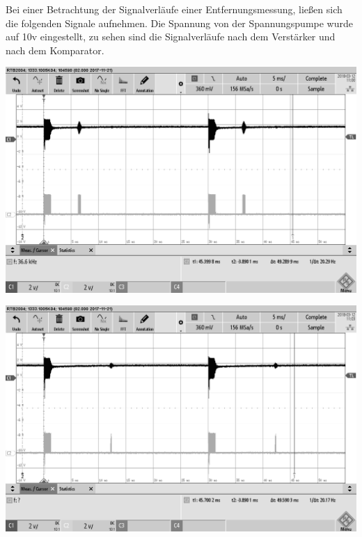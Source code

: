 Bei einer Betrachtung der Signalverläufe einer Entfernungsmessung, ließen sich die folgenden Signale aufnehmen. Die Spannung von der Spannungspumpe wurde auf 10v eingestellt, zu sehen sind die Signalverläufe nach dem Verstärker und nach dem Komparator.\\
\begin{minipage}{0.5\textwidth}
\includegraphics[width=1\textwidth%
]{Abbildungen/MessungenP2/10V/EKULIT1m.png}
\label{fig:EKULIT 1m}
\end{minipage}
\begin{minipage}{0.5\textwidth}
\includegraphics[width=1\textwidth%
]{Abbildungen/MessungenP2/10V/EKULIT2m.png}
\label{fig:EKULIT 2m}
\end{minipage}
